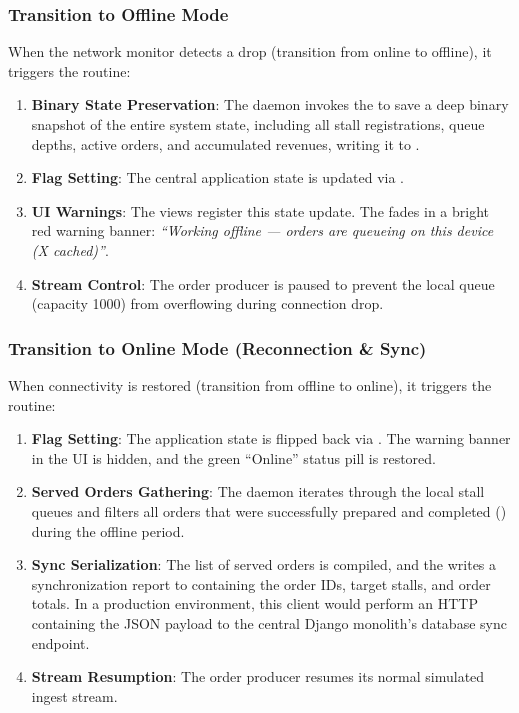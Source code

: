 \subsubsection{Transition to Offline Mode}
When the network monitor detects a drop (transition from online to offline), it triggers the  routine:
\begin{enumerate}
    \item \textbf{Binary State Preservation}: The daemon invokes the  to save a deep binary snapshot of the entire system state, including all stall registrations, queue depths, active orders, and accumulated revenues, writing it to .
    \item \textbf{Flag Setting}: The central application state is updated via .
    \item \textbf{UI Warnings}: The views register this state update. The  fades in a bright red warning banner: \textit{``Working offline --- orders are queueing on this device (X cached)''}.
    \item \textbf{Stream Control}: The order producer is paused to prevent the local queue (capacity 1000) from overflowing during connection drop.
\end{enumerate}

\subsubsection{Transition to Online Mode (Reconnection \& Sync)}
When connectivity is restored (transition from offline to online), it triggers the  routine:
\begin{enumerate}
    \item \textbf{Flag Setting}: The application state is flipped back via . The warning banner in the UI is hidden, and the green ``Online'' status pill is restored.
    \item \textbf{Served Orders Gathering}: The daemon iterates through the local stall queues and filters all orders that were successfully prepared and completed () during the offline period.
    \item \textbf{Sync Serialization}: The list of served orders is compiled, and the  writes a synchronization report to  containing the order IDs, target stalls, and order totals. In a production environment, this client would perform an HTTP  containing the JSON payload to the central Django monolith's database sync endpoint.
    \item \textbf{Stream Resumption}: The order producer resumes its normal simulated ingest stream.
\end{enumerate}

